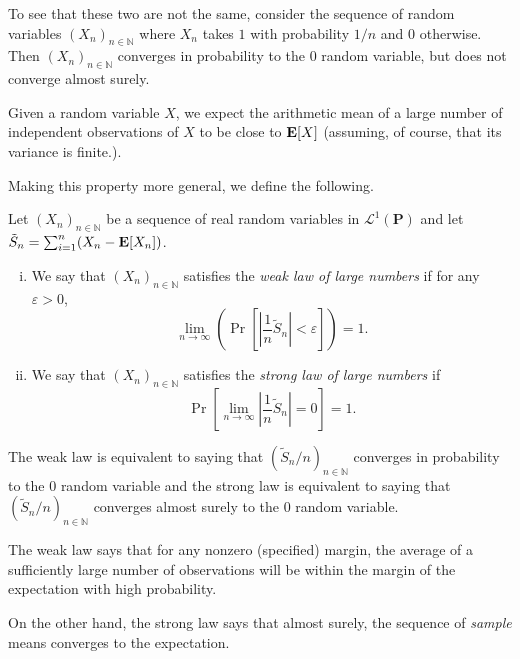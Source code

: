 To see that these two are not the same, consider the sequence of random variables $(X_n)_{n\in\mathbb{N}}$ where $X_n$ takes $1$ with probability $1/n$ and $0$ otherwise. Then $(X_n)_{n\in\mathbb{N}}$ converges in probability to the $0$ random variable, but does not converge almost surely.

\vspace{2mm}
Given a random variable $X$, we expect the arithmetic mean of a large number of independent observations of $X$ to be close to $\textbf{E}[X]$ (assuming, of course, that its variance is finite.).

\vspace{1mm}
Making this property more general, we define the following.

\begin{fdef}
    Let $(X_n)_{n\in\mathbb{N}}$ be a sequence of real random variables in $\mathcal{L}^1(\textbf{P})$ and let $\tilde{S}_n=\sum_{i=1}^n (X_n-\textbf{E}[X_n])$.
    \begin{enumerate}[(i)]
        \item We say that $(X_n)_{n\in\mathbb{N}}$ satisfies the \textit{weak law of large numbers} if for any $\varepsilon>0$,
        $$\lim_{n\to\infty}\left(\Pr\left[\left|\frac{1}{n}\tilde{S}_n\right| < \varepsilon\right]\right)=1.$$
        
        \item We say that $(X_n)_{n\in\mathbb{N}}$ satisfies the \textit{strong law of large numbers} if
        $$\Pr\left[\lim_{n\to\infty}\left|\frac{1}{n}\tilde{S}_n\right|=0\right]=1.$$
    \end{enumerate}
\end{fdef}

The weak law is equivalent to saying that $(\tilde{S}_n/n)_{n\in\mathbb{N}}$ converges in probability to the $0$ random variable and the strong law is equivalent to saying that $(\tilde{S}_n/n)_{n\in\mathbb{N}}$ converges almost surely to the $0$ random variable.

\vspace{2mm}
The weak law says that for any nonzero (specified) margin, the average of a sufficiently large number of observations will be within the margin of the expectation with high probability.

\vspace{1mm}
On the other hand, the strong law says that almost surely, the sequence of \textit{sample} means converges to the expectation.

